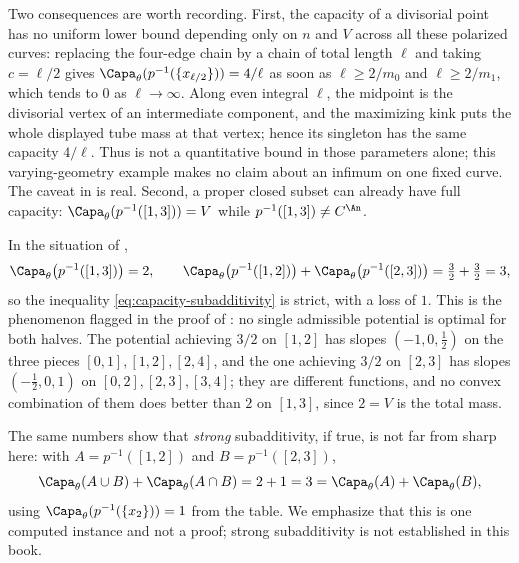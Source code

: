 \begin{example}
Two consequences are worth recording.  First, the capacity of a divisorial
point has no uniform lower bound depending only on $n$ and $V$ across
all these polarized curves: replacing the four-edge chain
by a chain of total length $\ell$ and taking $c=\ell/2$ gives
$\Capa_\theta(p^{-1}(\{x_{\ell/2}\}))=4/\ell$ as soon as
$\ell\geq2/m_0$ and $\ell\geq2/m_1$, which tends to $0$ as
$\ell\to\infty$.  Along even integral $\ell$, the midpoint is the
divisorial vertex of an intermediate component, and the maximizing kink
puts the whole displayed tube mass at that vertex; hence its singleton has
the same capacity $4/\ell$.  Thus
 is not
a quantitative bound in those parameters alone; this varying-geometry
example makes no claim about an infimum on one fixed curve.  The caveat in
 is real.  Second, a proper closed subset
can already have full capacity: $\Capa_\theta(p^{-1}([1,3]))=V$ while
$p^{-1}([1,3])\neq C^{\An}$.
\end{example}

\begin{example}
\label{ex:ch25-subadditivity-strict}
In the situation of ,
\[
 \Capa_\theta\bigl(p^{-1}([1,3])\bigr)=2,
 \qquad
 \Capa_\theta\bigl(p^{-1}([1,2])\bigr)
 +\Capa_\theta\bigl(p^{-1}([2,3])\bigr)=\tfrac32+\tfrac32=3 ,
\]
so the inequality \eqref{eq:capacity-subadditivity} is strict, with a loss of
$1$.  This is the phenomenon flagged in the proof of
: no single admissible potential is optimal
for both halves.  The potential achieving $3/2$ on $[1,2]$ has slopes
$(-1,0,\tfrac12)$ on the three pieces $[0,1],[1,2],[2,4]$, and the one
achieving $3/2$ on $[2,3]$ has slopes
$(-\tfrac12,0,1)$ on $[0,2],[2,3],[3,4]$; they are different functions,
and no convex combination of them does better than $2$ on $[1,3]$, since
$2=V$ is the total mass.

The same numbers show that \emph{strong} subadditivity, if true, is not far
from sharp here: with $A=p^{-1}([1,2])$ and $B=p^{-1}([2,3])$,
\[
 \Capa_\theta(A\cup B)+\Capa_\theta(A\cap B)=2+1=3
 =\Capa_\theta(A)+\Capa_\theta(B),
\]
using $\Capa_\theta(p^{-1}(\{x_2\}))=1$ from the table.  We emphasize that
this is one computed instance and not a proof; strong subadditivity is not
established in this book.
\end{example}


